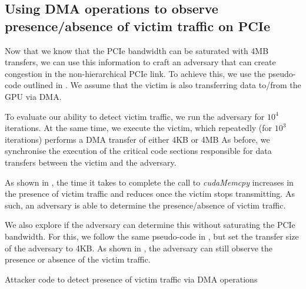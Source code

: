 \subsection{Using DMA operations to observe presence/absence of victim traffic on PCIe}
\label{subsec:interconnect-sc-dma-evaluation}

Now that we know that the PCIe bandwidth can be saturated with 4MB transfers, we can use this information to craft an adversary that can create congestion in the non-hierarchical PCIe link.
To achieve this, we use the pseudo-code outlined in .
We assume that the victim is also transferring data to/from the GPU via DMA.

To evaluate our ability to detect victim traffic, we run the adversary for $10^4$ iterations.
At the same time, we execute the victim, which repeatedly (for $10^3$ iterations) performs a DMA transfer of either 4KB or 4MB
As before, we synchronise the execution of the critical code sections responsible for data transfers between the victim and the adversary. 

As shown in , the time it takes to complete the call to \textit{cudaMemcpy} increases in the presence of victim traffic and reduces once the victim stops transmitting.
As such, an adversary is able to determine the presence/absence of victim traffic.

We also explore if the adversary can determine this without saturating the PCIe bandwidth.
For this, we follow the same pseudo-code in , but set the transfer size of the adversary to 4KB.
As shown in , the adversary can still observe the presence or absence of the victim traffic.

\begin{minipage}{\textwidth}
    
    \captionsetup{type=lstlisting}
    \caption{Attacker code to detect presence of victim traffic via DMA operations}
    \label{lst:timing-victim-with-dma}
\end{minipage}

